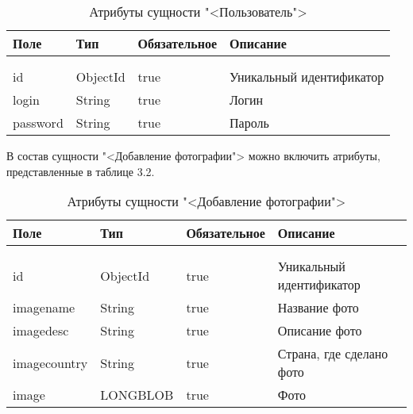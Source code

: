 \begin{xltabular}{\textwidth}{|l|l|p{1.7cm}|X|}
	\caption{Атрибуты сущности "<Пользователь">\label{news:table}}\\ \hline
	\centrow Поле & \centrow Тип & \centrow Обяза\-тельное & \centrow Описание \\ \hline
	 &  &  &  \\ \hline
	\endfirsthead
	 &  &  &  \\ \hline
	\finishhead
	id & ObjectId & true & Уникальный идентификатор \\ \hline 
	login & String & true & Логин \\ \hline 
	password & String & true & Пароль \\ \hline 
\end{xltabular}

В состав сущности "<Добавление фотографии"> можно включить атрибуты, представленные в таблице 3.2.

\begin{xltabular}{\textwidth}{|l|l|p{1.7cm}|X|}
	\caption{Атрибуты сущности "<Добавление фотографии">\label{news:table}}\\ \hline
	\centrow Поле & \centrow Тип & \centrow Обяза\-тельное & \centrow Описание \\ \hline
	 &  &  &  \\ \hline
	\endfirsthead
	 &  &  &  \\ \hline
	\finishhead
	id & ObjectId & true & Уникальный идентификатор \\ \hline 
	imagename & String & true & Название фото \\ \hline 
	imagedesc & String & true & Описание фото \\ \hline 
	imagecountry & String & true & Страна, где сделано фото \\ \hline 
	image & LONGBLOB & true & Фото \\ \hline 
\end{xltabular}
